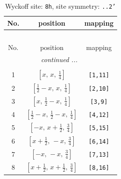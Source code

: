 \documentclass[fleqn,8pt]{jsarticle}
\begin{document}
\begin{longtable}{ccc}
\caption{Wyckoff site: {\tt 8h}, site symmetry: {\tt ..2'}}
 \\
 \hline \hline
No. & position & mapping \\ \hline \endfirsthead

\multicolumn{2}{l}{\tablename\ \thetable{}} \\
 \hline \hline
No. & position & mapping \\ \hline \endhead

 \hline \hline
\multicolumn{2}{r}{\footnotesize\it continued ...} \\ \endfoot

 \hline \hline
\multicolumn{2}{r}{} \\ \endlastfoot

1 & $\left[ x,\, x,\, \frac{1}{4} \right]$ & {\tt [1,11]} \\ \hline
2 & $\left[ \frac{1}{2} - x,\, x,\, \frac{1}{4} \right]$ & {\tt [2,10]} \\ \hline
3 & $\left[ x,\, \frac{1}{2} - x,\, \frac{1}{4} \right]$ & {\tt [3,9]} \\ \hline
4 & $\left[ \frac{1}{2} - x,\, \frac{1}{2} - x,\, \frac{1}{4} \right]$ & {\tt [4,12]} \\ \hline
5 & $\left[ - x,\, x + \frac{1}{2},\, \frac{3}{4} \right]$ & {\tt [5,15]} \\ \hline
6 & $\left[ x + \frac{1}{2},\, - x,\, \frac{3}{4} \right]$ & {\tt [6,14]} \\ \hline
7 & $\left[ - x,\, - x,\, \frac{3}{4} \right]$ & {\tt [7,13]} \\ \hline
8 & $\left[ x + \frac{1}{2},\, x + \frac{1}{2},\, \frac{3}{4} \right]$ & {\tt [8,16]} \\
\end{longtable}
\renewcommand{\arraystretch}{1.2}
\end{document}
